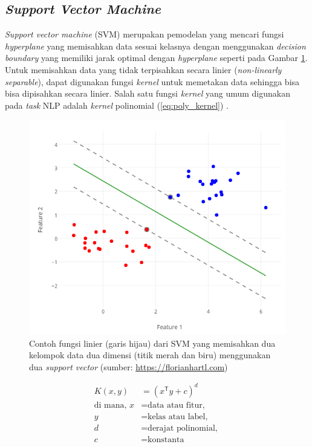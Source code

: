 \subsection{\textit{Support Vector Machine}}

\textit{Support vector machine} (SVM) merupakan pemodelan yang mencari fungsi \textit{hyperplane} yang memisahkan data sesuai kelasnya dengan menggunakan \textit{decision boundary} yang memiliki jarak optimal dengan \textit{hyperplane} \citep{theodoridis2015machine} seperti pada Gambar \ref{fig:svm}. Untuk memisahkan data yang tidak terpisahkan secara linier (\textit{non-linearly separable}), dapat digunakan fungsi \textit{kernel} untuk memetakan data sehingga bisa bisa dipisahkan secara linier. Salah satu fungsi \textit{kernel} yang umum digunakan pada \textit{task} NLP adalah \textit{kernel} polinomial (\ref{eq:poly_kernel}) \citep{joachims1998text}.

\begin{figure}
\centering
\includegraphics[scale=0.5]{../images/svm.png}
\caption{Contoh fungsi linier (garis hijau) dari SVM yang memisahkan dua kelompok data dua dimensi (titik merah dan biru) menggunakan dua \textit{support vector} (sumber: \url{https://florianhartl.com})}
\label{fig:svm}
\end{figure}

\noindent \begin{align} \label{eq:poly_kernel}
K(x,y) &= (x^\mathsf{T} y + c)^{d} \\ \nonumber
\textrm{di mana, } x &= \textrm{data atau fitur, } \\ \nonumber 
	y &= \textrm{kelas atau label, } \\ \nonumber
	d &= \textrm{derajat polinomial, } \\ \nonumber 
	c &= \textrm{konstanta} \\ \nonumber 
\end{align}

